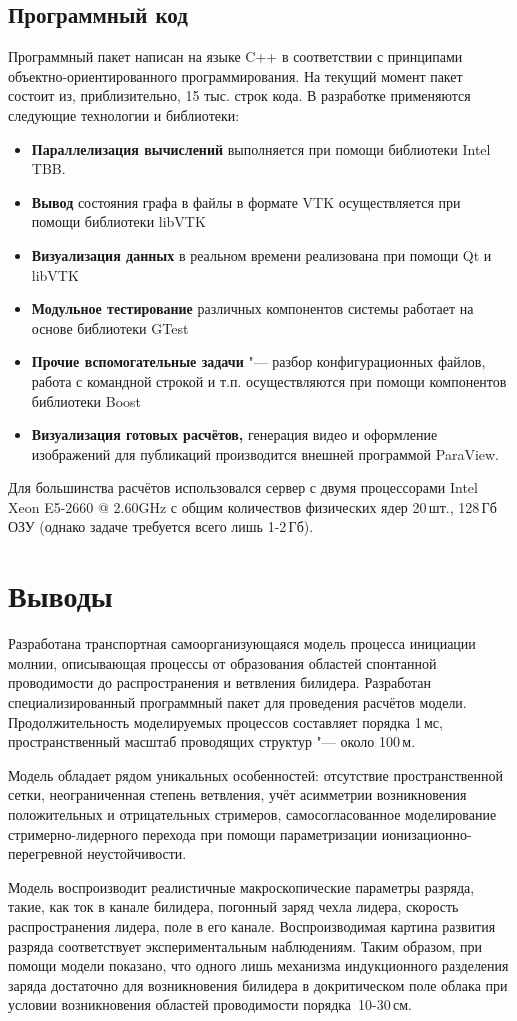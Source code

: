 \subsection{Программный код}
Программный пакет написан на языке C++ в соответствии с принципами объектно-ориентированного программирования. На текущий момент пакет состоит из, приблизительно, 15 тыс. строк кода. В разработке применяются следующие технологии и библиотеки:
\begin{itemize}
	\item \textbf{Параллелизация вычислений} выполняется при помощи библиотеки Intel TBB.
	\item \textbf{Вывод} состояния графа в файлы в формате VTK осуществляется при помощи библиотеки libVTK
	\item \textbf{Визуализация данных} в реальном времени реализована при помощи Qt и libVTK
	\item \textbf{Модульное тестирование} различных компонентов системы работает на основе библиотеки GTest
	\item \textbf{Прочие вспомогательные задачи} "--- разбор конфигурационных файлов, работа с командной строкой и т.п. осуществляются при помощи компонентов библиотеки Boost
	\item \textbf{Визуализация готовых расчётов,} генерация видео и оформление изображений для публикаций производится внешней программой ParaView.
\end{itemize}

Для большинства расчётов использовался сервер с двумя процессорами Intel Xeon E5-2660 @ 2.60GHz с общим количествов физических ядер 20\,шт., 128\,Гб ОЗУ (однако задаче требуется всего лишь 1-2\,Гб).

\section{Выводы}
Разработана транспортная самоорганизующаяся модель процесса инициации молнии, описывающая процессы от образования областей спонтанной проводимости до распространения и ветвления билидера. Разработан специализированный программный пакет для проведения расчётов модели. Продолжительность моделируемых процессов составляет порядка 1\,мс, пространственный масштаб проводящих структур "--- около 100\,м.

Модель обладает рядом уникальных особенностей: отсутствие пространственной сетки, неограниченная степень ветвления, учёт асимметрии возникновения положительных и отрицательных стримеров, самосогласованное моделирование стримерно-лидерного перехода при помощи параметризации ионизационно-перегревной неустойчивости.

Модель воспроизводит реалистичные макроскопические параметры разряда, такие, как ток в канале билидера, погонный заряд чехла лидера, скорость распространения лидера, поле в его канале. Воспроизводимая картина развития разряда соответствует экспериментальным наблюдениям. Таким образом, при помощи модели показано, что одного лишь механизма индукционного разделения заряда достаточно для возникновения билидера в докритическом поле облака при условии возникновения областей проводимости порядка~10-30\,см.

\FloatBarrier
